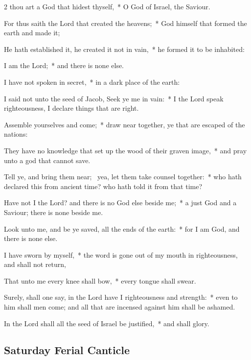 \begin{multicols}{2}
 thou art a God that hidest thyself,~* O God of Israel, the Saviour.\par
{}
For thus saith the Lord that created the heavens;~* God himself that formed the earth and made it;\par
He hath established it, he created it not in vain,~* he formed it to be inhabited:\par
I am the Lord;~* and there is none else.\par
I have not spoken in secret,~* in a dark place of the earth:\par
I said not unto the seed of Jacob, Seek ye me in vain:~* I the Lord speak righteousness, I declare things that are right.\par
Assemble yourselves and come;~* draw near together, ye that are escaped of the nations:\par
They have no knowledge that set up the wood of their graven image,~* and pray unto a god that cannot save.\par
Tell ye, and bring them near;~{\dag} yea, let them take counsel together:~* who hath declared this from ancient time? who hath told it from that time?\par
Have not I the Lord? and there is no God else beside me;~* a just God and a Saviour; there is none beside me.\par
Look unto me, and be ye saved, all the ends of the earth:~* for I am God, and there is none else.\par
I have sworn by myself,~* the word is gone out of my mouth in righteousness, and shall not return,\par
That unto me every knee shall bow,~* every tongue shall swear.\par
Surely, shall one say, in the Lord have I righteousness and strength:~* even to him shall men come; and all that are incensed against him shall be ashamed.\par
In the Lord shall all the seed of Israel be justified,~* and shall glory.

\subsection{Saturday Ferial Canticle}


\end{multicols}
